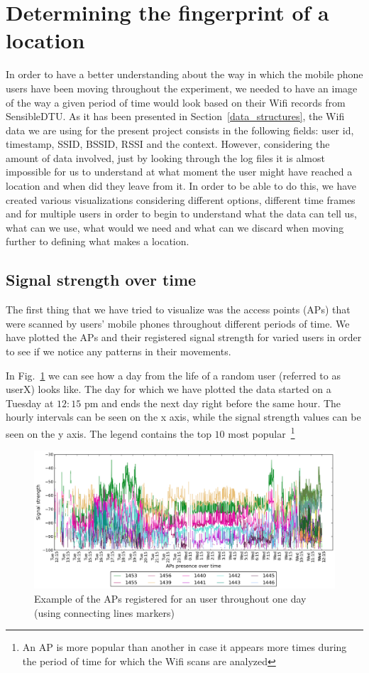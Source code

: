 \section{Determining the fingerprint of a location}
In order to have a better understanding about the way in which the mobile phone
users have been moving throughout the experiment, we needed to have an image of
the way a given period of time would look based on their Wifi records from
SensibleDTU. As it has been presented in Section~\ref{data_structures}, the Wifi
data we are using for the present project consists in the following fields:
user id, timestamp, SSID, BSSID, RSSI and the context. However, considering the
amount of data involved, just by looking through the log files it is almost
impossible for us to understand at what moment the user might have reached a
location and when did they leave from it. In order to be able to do this, we
have created various visualizations considering different options, different
time frames and for multiple users in order to begin to understand what the data
can tell us, what can we use, what would we need and what can we discard when
moving further to defining what makes a location.

\subsection{Signal strength over time}

The first thing that we have tried to visualize was the access points (APs) that
were scanned by users' mobile phones throughout different periods of time. We
have plotted the APs and their registered signal strength for varied users in
order to see if we notice any patterns in their movements.

In Fig.~\ref{user_6_1d_lines} we can see how a day from the life of a random
user (referred to as userX) looks like. The day for which we have plotted the
data started on a Tuesday at $12:15$ pm and ends the next day right before the
same hour. The hourly intervals can be seen on the x axis, while the signal
strength values can be seen on the y axis. The legend contains the top $10$ most
popular~\footnote{An AP is more popular than another in case it appears more
times during the period of time for which the Wifi scans are analyzed}

\begin{figure}[h]
\centering
\includegraphics[height =
0.45\textwidth]{figures/user_6_sorted_1days_plot.png}
\caption{Example of the APs registered for an user throughout one day (using
connecting lines markers)}
\label{user_6_1d_lines}
\end{figure}

